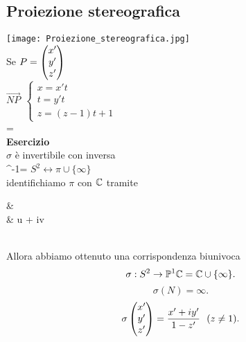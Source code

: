 \documentclass[12px]{article}
\begin{document}
	\subsection{Proiezione stereografica}
	\texttt{[image: Proiezione\_stereografica.jpg]}\\
	Se $P = \begin{pmatrix}x'\\y'\\z'\end{pmatrix}$\\
	 $\overrightarrow{NP}\ \ \begin{cases}
	 	x = x't\\
		t = y't\\
		z = (z-1)t + 1
	 \end{cases}$\\
	 \sigma {} = \\
	 \textbf{Esercizio}\\
	 $\sigma$ è invertibile con inversa\\
	 \sigma^-1=
	 $S^2 \leftrightarrow \pi\cup \{\infty\}$\\
	 identifichiamo  $\pi$ con $\mathbb{C}$ tramite\\
	 \begin{aligend}
		&\pi \ \ \ \ \rightarrow\ \ \ \ \ \C\\
		& \rightarrow u + iv
	 \end{aligend}\\
	 Allora abbiamo ottenuto una corrispondenza biunivoca 
	 \[
		 \sigma : S^2 \rightarrow \mathbb{P}^1{\mathbb{C}} = \mathbb{C}\cup\{\infty\}
	 .\] 
	 \[
	 \sigma(N) =\infty
	 .\] 
	 \[
	 \sigma\begin{pmatrix}x'\\y'\\z'\end{pmatrix} = \frac{x'+iy' }{1-z'} \ \ (z\neq 1)
	 .\] 
\end{document}
